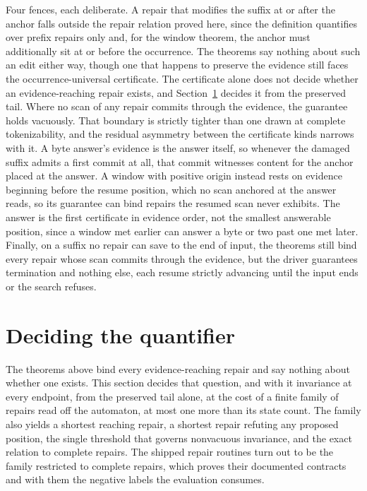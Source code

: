 \documentclass[11pt,a4paper]{article}
\theoremstyle{definition}
\theoremstyle{plain}
\theoremstyle{remark}
\begin{document}
Four fences, each deliberate. A repair that modifies the suffix at or after the anchor falls outside the repair relation
proved here, since the definition quantifies over prefix repairs only and, for the window theorem, the anchor must
additionally sit at or before the occurrence. The theorems say nothing about such an edit either way, though one that
happens to preserve the evidence still faces the occurrence-universal certificate. The certificate alone does not decide
whether an evidence-reaching repair exists, and Section~\ref{sec:exact} decides it from the preserved tail. Where no
scan of any repair commits through the evidence, the guarantee holds vacuously. That boundary is strictly tighter than
one drawn at complete tokenizability, and the residual asymmetry between the certificate kinds narrows with it. A byte
answer's evidence is the answer itself, so whenever the damaged suffix admits a first commit at all, that commit
witnesses content for the anchor placed at the answer. A window with positive origin instead rests on evidence beginning
before the resume position, which no scan anchored at the answer reads, so its guarantee can bind repairs the resumed
scan never exhibits. The answer is the first certificate in evidence order, not the smallest answerable position, since
a window met earlier can answer a byte or two past one met later. Finally, on a suffix no repair can save to the end of
input, the theorems still bind every repair whose scan commits through the evidence, but the driver guarantees
termination and nothing else, each resume strictly advancing until the input ends or the search refuses.

\section{Deciding the quantifier}
\label{sec:exact}

The theorems above bind every evidence-reaching repair and say nothing about whether one exists. This section decides
that question, and with it invariance at every endpoint, from the preserved tail alone, at the cost of a finite family
of repairs read off the automaton, at most one more than its state count. The family also yields a shortest reaching
repair, a shortest repair refuting any proposed position, the single threshold that governs nonvacuous invariance, and
the exact relation to complete repairs. The shipped repair routines turn out to be the family restricted to complete
repairs, which proves their documented contracts and with them the negative labels the evaluation consumes.
\end{document}
